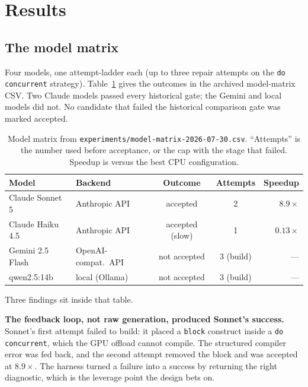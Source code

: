 \documentclass[11pt]{article}
\newcommand{\code}[1]{\texttt{#1}}
\begin{document}
\section{Results}
\label{sec:results}

\subsection{The model matrix}

Four models, one attempt-ladder each (up to three repair attempts on the
\code{do concurrent} strategy). Table~\ref{tab:matrix} gives the outcomes in the
archived model-matrix CSV. Two Claude models passed every historical gate; the
Gemini and local models did not. No candidate that failed the historical
comparison gate was marked accepted.

\begin{table}[htbp]
\centering\small
\begin{tabular}{@{}llccr@{}}
\toprule
\textbf{Model} & \textbf{Backend} & \textbf{Outcome} & \textbf{Attempts} & \textbf{Speedup} \\
\midrule
Claude Sonnet 5   & Anthropic API        & accepted            & 2 & $\mathbf{8.9\times}$ \\
Claude Haiku 4.5  & Anthropic API        & accepted (slow)     & 1 & $0.13\times$ \\
Gemini 2.5 Flash  & OpenAI-compat.\ API  & not accepted        & 3 (build) & --- \\
qwen2.5:14b       & local (Ollama)       & not accepted        & 3 (build) & --- \\
\bottomrule
\end{tabular}
\caption{Model matrix from \code{experiments/model-matrix-2026-07-30.csv}.
``Attempts'' is the number used before acceptance, or the cap with the stage
that failed. Speedup is versus the best CPU configuration.}
\label{tab:matrix}
\end{table}

Three findings sit inside that table.

\textbf{The feedback loop, not raw generation, produced Sonnet's success.}
Sonnet's first attempt failed to build: it placed a \code{block} construct inside
a \code{do concurrent}, which the GPU offload cannot compile. The structured
compiler error was fed back, and the second attempt removed the block and was
accepted at $8.9\times$. The harness turned a failure into a success by
returning the right diagnostic, which is the leverage point the design bets on.
\end{document}
